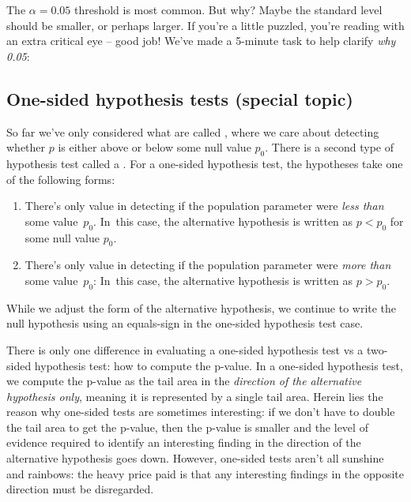 \begin{termBox}{
The $\alpha = 0.05$ threshold is most common. But why?
Maybe the standard level should be smaller, or perhaps larger.
If you're a little puzzled, you're reading with an
extra critical eye -- good job!
We've made a 5-minute task to help clarify \emph{why 0.05}:
\begin{center}
\end{center}}
\end{termBox}




\subsection{One-sided hypothesis tests (special topic)}

So far we've only considered what are called , where we care about detecting whether $p$
is either above or below some null value $p_0$.
There is a second type of hypothesis test called a
.
For a one-sided hypothesis test,
the hypotheses take one of the following forms:
\begin{enumerate}
\item There's only value in detecting if the population
    parameter were \emph{less than} some value~$p_0$.
    In~this case, the alternative hypothesis is written
    as $p < p_0$ for some null value $p_0$.
\item There's only value in detecting if the population
    parameter were \emph{more than} some value~$p_0$:
    In~this case, the alternative hypothesis is written
    as $p > p_0$.
\end{enumerate}
While we adjust the form of the alternative hypothesis,
we continue to write the null hypothesis using an equals-sign
in the one-sided hypothesis test case.

There is only one difference in evaluating a one-sided
hypothesis test vs a two-sided hypothesis test: how to
compute the p-value.
In a one-sided hypothesis test, we compute the p-value as
the tail area in the \emph{direction of the alternative
hypothesis only}, meaning it is represented by a single
tail area. Herein lies the reason why one-sided tests
are sometimes interesting: if we don't have to double
the tail area to get the p-value, then the p-value is
smaller and the level of evidence required to identify
an interesting finding in the direction of the
alternative hypothesis goes down.
However, one-sided tests aren't all sunshine and rainbows:
the heavy price paid is that any interesting findings
in the opposite direction must be disregarded.

